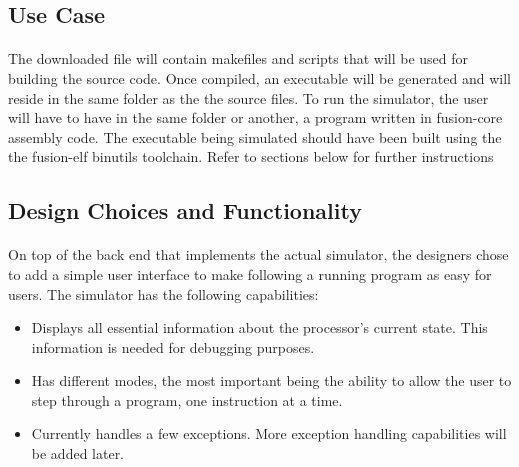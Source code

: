 \documentclass[letterpaper, 11pt, twoside]{article}
\begin{document}
\subsection{Use Case}
\paragraph{}
\begin{flushleft}
The downloaded file will contain makefiles and scripts that will be used for building the source code. Once compiled, an executable will be generated and will reside in the same folder as the the source files. To run the simulator, the user will have to have in the same folder or another, a program written in fusion-core assembly code. The executable being simulated should have been built using the the fusion-elf binutils toolchain. Refer to sections below for further instructions
\end{flushleft}


\subsection{Design Choices and Functionality}
\paragraph{}
\begin{flushleft}
On top of the back end that implements the actual simulator, the designers chose to add a simple user interface to make following a running program as easy for users. The simulator has the following capabilities:
 
 \begin{itemize}
     \item  Displays all essential information about the processor's current state. This information is needed for debugging purposes.
     \item Has different modes, the most important being the ability to allow the user to step through a program, one instruction at a time.
     \item Currently handles a few exceptions. More exception handling capabilities will be added later.
 \end{itemize}
\end{flushleft}
\end{document}
